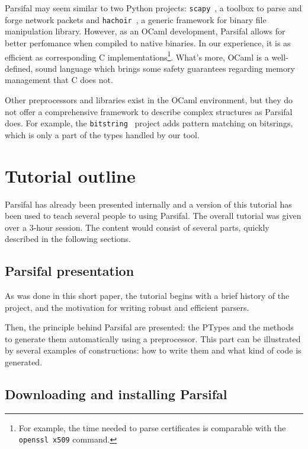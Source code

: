 \documentclass{article}
\begin{document}
Parsifal may seem similar to two Python projects:
\texttt{scapy}~\cite{scapy}, a toolbox to parse and forge network
packets and \texttt{hachoir}~\cite{hachoir}, a generic framework for
binary file manipulation library. However, as an OCaml development,
Parsifal allows for better perfomance when compiled to native
binaries. In our experience, it is as efficient as corresponding C
implementations\footnote{For example, the time needed to parse
  certificates is comparable with the \texttt{openssl x509}
  command.}. What's more, OCaml is a well-defined, sound language which
brings some safety guarantees regarding memory management that C does
not.

Other preprocessors and libraries exist in the OCaml environment, but
they do not offer a comprehensive framework to describe complex
structures as Parsifal does. For example, the
\texttt{bitstring}~\cite{bitstring} project adds pattern matching on
bitsrings, which is only a part of the types handled by our tool.



\section{Tutorial outline}

Parsifal has already been presented internally and a version of this
tutorial has been used to teach several people to using Parsifal. The
overall tutorial was given over a 3-hour session. The content would
consist of several parts, quickly described in the following sections.



\subsection{Parsifal presentation}

As was done in this short paper, the tutorial begins with a brief
history of the project, and the motivation for writing robust and
efficient parsers.

Then, the principle behind Parsifal are presented: the PTypes and the
methods to generate them automatically using a preprocessor. This part
can be illustrated by several examples of constructions: how to write
them and what kind of code is generated.


\subsection{Downloading and installing Parsifal}
\end{document}
